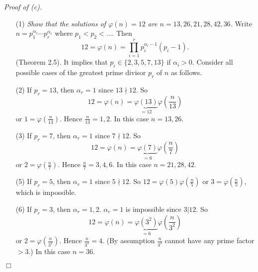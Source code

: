\documentclass{article}
\begin{document}
\emph{Proof of (c).}
\begin{enumerate}
\item[(1)]
  \emph{Show that the solutions of $\varphi(n) = 12$
  are $n = 13, 26, 21, 28, 42, 36$.}
  Write $n = p_1^{\alpha_1} \cdots p_r^{\alpha_r}$
  where $p_1 < p_2 < \ldots$.
  Then
  \[
    12 = \varphi(n) = \prod_{i=1}^{r} p_i^{\alpha_i - 1}(p_i - 1).
  \]
  (Theorem 2.5).
  It implies that $p_i \in \{ 2, 3, 5, 7, 13 \}$ if $\alpha_i > 0$.
  Consider all possible cases of the greatest prime divisor $p_r$ of $n$ as follows.

\item[(2)]
  If $p_r = 13$, then $\alpha_r = 1$ since $13 \nmid 12$.
  So
  \[
    12
    = \varphi(n)
    = \underbrace{\varphi(13)}_{= 12} \varphi\left(\frac{n}{13}\right)
  \]
  or $1 = \varphi\left(\frac{n}{13}\right)$.
  Hence $\frac{n}{13} = 1, 2$.
  In this case $n = 13, 26$.

\item[(3)]
  If $p_r = 7$, then $\alpha_r = 1$ since $7 \nmid 12$.
  So
  \[
    12
    = \varphi(n)
    = \underbrace{\varphi(7)}_{= 6} \varphi\left(\frac{n}{7}\right)
  \]
  or $2 = \varphi\left(\frac{n}{7}\right)$.
  Hence $\frac{n}{7} = 3, 4, 6$.
  In this case $n = 21, 28, 42$.

\item[(5)]
  If $p_r = 5$, then $\alpha_r = 1$ since $5 \nmid 12$.
  So $12 = \varphi(5)\varphi\left(\frac{n}{5}\right)$
  or $3 = \varphi\left(\frac{n}{5}\right)$, which is impossible.

\item[(6)]
  If $p_r = 3$, then $\alpha_r = 1, 2$.
  $\alpha_r = 1$ is impossible since $3 | 12$.
  So
  \[
    12
    = \varphi(n)
    = \underbrace{\varphi(3^2)}_{= 6}\varphi\left(\frac{n}{3^2}\right)
  \]
  or $2 = \varphi\left(\frac{n}{3^2}\right)$.
  Hence $\frac{n}{3^2} = 4$.
  (By assumption $\frac{n}{3^2}$ cannot have any prime factor $> 3$.)
  In this case $n = 36$.
\end{enumerate}
$\Box$ \\\\



\end{document}
